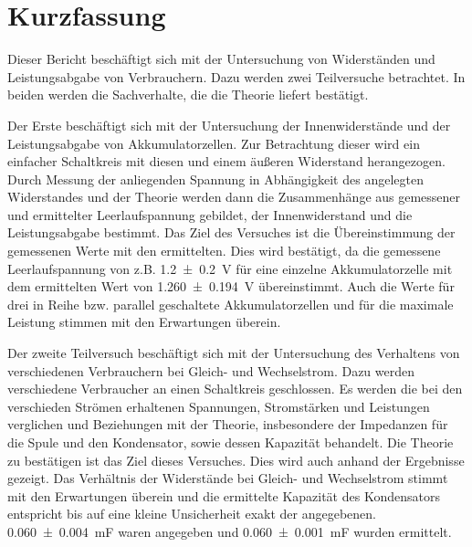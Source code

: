 
\section{Kurzfassung}

Dieser Bericht beschäftigt sich mit der Untersuchung von Widerständen und Leistungsabgabe von Verbrauchern. 
Dazu werden zwei Teilversuche betrachtet. In beiden werden die Sachverhalte, die die Theorie liefert bestätigt.

Der Erste beschäftigt sich mit der Untersuchung der Innenwiderstände und der Leistungsabgabe von Akkumulatorzellen.
Zur Betrachtung dieser wird ein einfacher Schaltkreis mit diesen und einem äußeren Widerstand herangezogen.
Durch Messung der anliegenden Spannung in Abhängigkeit des angelegten Widerstandes und der Theorie werden dann die Zusammenhänge aus gemessener und ermittelter Leerlaufspannung gebildet, der Innenwiderstand und die Leistungsabgabe bestimmt.
Das Ziel des Versuches ist die Übereinstimmung der gemessenen Werte mit den ermittelten. 
Dies wird bestätigt, da die gemessene Leerlaufspannung von z.B. \SI{1,2+-0,2}{V} für eine einzelne Akkumulatorzelle mit dem ermittelten Wert von \SI{1,260+-0,194}{V} übereinstimmt. Auch die Werte für drei in Reihe bzw. parallel geschaltete Akkumulatorzellen und für die maximale Leistung stimmen mit den Erwartungen überein.

Der zweite Teilversuch beschäftigt sich mit der Untersuchung des Verhaltens von verschiedenen Verbrauchern bei Gleich- und Wechselstrom.
Dazu werden verschiedene Verbraucher an einen Schaltkreis geschlossen.
Es werden die bei den verschieden Strömen erhaltenen Spannungen, Stromstärken und Leistungen verglichen und Beziehungen mit der Theorie, insbesondere der Impedanzen für die Spule und den Kondensator, sowie dessen Kapazität behandelt. 
Die Theorie zu bestätigen ist das Ziel dieses Versuches.
Dies wird auch anhand der Ergebnisse gezeigt.
Das Verhältnis der Widerstände bei Gleich- und Wechselstrom stimmt mit den Erwartungen überein und die ermittelte Kapazität des Kondensators entspricht bis auf eine kleine Unsicherheit exakt der angegebenen. \SI{0,060+-0,004}{\milli\farad} waren angegeben und \SI{0,060+-0,001}{\milli\farad} wurden ermittelt. 

